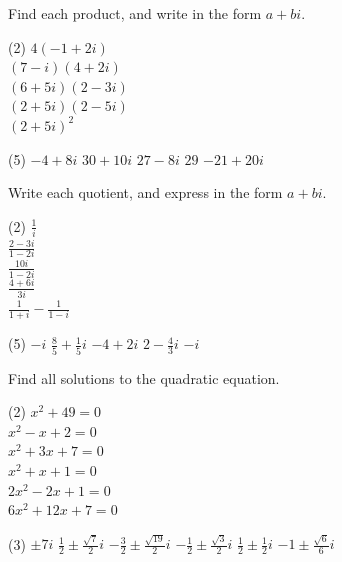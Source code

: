 \documentclass[12pt,fleqn]{book}
\newcommand{\prb}[1]{\begin{Exercise}#1\end{Exercise}}
\newcommand{\sol}[1]{\begin{Answer}#1\end{Answer}}
\begin{document}
\prb{Find each product, and write in the form $a+bi$.
	\begin{tasks}(2)
		\task $4(-1+2 i)$ \\[4em]
		\task $(7-i)(4+2 i)$ \\[4em]
		\task $(6+5 i)(2-3 i)$ \\[4em]
		\task $(2+5 i)(2-5 i)$ \\[4em]
		\task $(2+5 i)^2$ \\[4em]
	\end{tasks}
}

\sol{
	\begin{tasks}(5)
		\task $-4+8 i $
		\task $30+10 i$
		\task $27-8 i $
		\task $29 $
		\task $-21+20 i $
	\end{tasks}
}


\prb{Write each quotient, and express in the form $a+bi$.
	\begin{tasks}(2)
		\task $\displaystyle \frac{1}{i}$ \\[5em]
		\task $\displaystyle \frac{2-3 i}{1-2 i}$ \\[5em]
		\task $\displaystyle \frac{10 i}{1-2 i}$ \\[5em]
		\task $\displaystyle \frac{4+6 i}{3 i}$ \\[5em]
		\task $\displaystyle \frac{1}{1+i}-\frac{1}{1-i}$ \\[5em]
	\end{tasks}
}

\sol{
	\begin{tasks}(5)
		\task $-i $
		\task $\frac{8}{5}+\frac{1}{5} i$
		\task $-4+2 i$
		\task $2-\frac{4}{3} i$
		\task $-i$
	\end{tasks}
}




\prb{Find all solutions to the quadratic equation.
	\begin{tasks}(2)
		\task $x^2+49=0$ \\[8em]
		\task $x^2-x+2=0$ \\[8em]
		\task $x^2+3 x+7=0$ \\[8em]
		\task $x^2+x+1=0$ \\[8em]
		\task $2 x^2-2 x+1=0$ \\[8em]
		\task $6 x^2+12 x+7=0$ \\[8em]
	\end{tasks}
}

\sol{
	\begin{tasks}(3)
		\task $\displaystyle \pm 7 i$
		\task $\displaystyle \frac{1}{2} \pm \frac{\sqrt{7}}{2} i $
		\task $\displaystyle -\frac{3}{2} \pm \frac{\sqrt{19}}{2} i$
		\task $\displaystyle -\frac{1}{2} \pm \frac{\sqrt{3}}{2} i $
		\task $\displaystyle \frac{1}{2} \pm \frac{1}{2} i $
		\task $\displaystyle -1 \pm \frac{\sqrt{6}}{6} i$
	\end{tasks}
}
\end{document}

